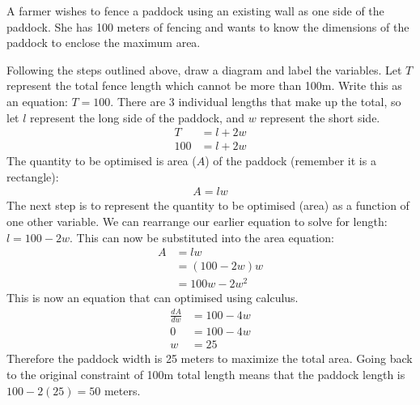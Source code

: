 \example A farmer wishes to fence a paddock using an existing wall as one side of the paddock. She has 100 meters of fencing and wants to know the dimensions of the paddock to enclose the maximum area.
\begin{center}
\end{center}
\solution Following the steps outlined above, draw a diagram and label the variables. Let $T$ represent the total fence length which cannot be more than 100m. Write this as an equation: $T=100$. There are 3 individual lengths that make up the total, so let $l$ represent the long side of the paddock, and $w$ represent the short side. 
\begin{align*}
T&=l+2w\\
100&=l+2w
\end{align*}
The quantity to be optimised is area ($A$) of the paddock (remember it is a rectangle):
\begin{align*}
A=lw
\end{align*}
The next step is to represent the quantity to be optimised (area) as a function of one other variable. We can rearrange our earlier equation to solve for length: $l=100-2w$. This can now be substituted into the area equation:
\begin{align*}
A&=lw\\
&=\left(100-2w\right)w\\
&=100w-2w^2
\end{align*}
This is now an equation that can optimised using calculus.
\begin{align*}
\frac{dA}{dw}&=100-4w\\
0&=100-4w\\
w&=25
\end{align*}
Therefore the paddock width is 25 meters to maximize the total area. Going back to the original constraint of 100m total length means that the paddock length is $100-2(25)=50$ meters.\\

